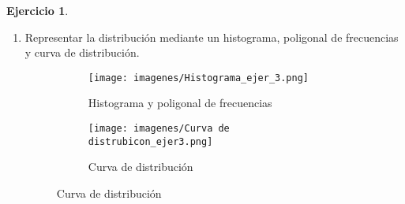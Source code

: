 \documentclass[a4paper, 12pt]{article}
\theoremstyle{definition}
\newtheorem{ej}{Ejercicio}
\begin{document}
\begin{ej}
\begin{enumerate}[label=\textit{\alph*)}]
    \begin{center}
    \begin{tabular}{|c|c|c|c|c|c|c|c|}
    \hline
     \(I_i\) & \(n_i\) & \(N_i \) & \(f_i \) & \(F_i\) & \(c_i\) & \(a_i\) & \(h_i\)  \\ \hline
     \([8300, 9300] \) & \(2 \) & \color{blue} \(2 \) & \color{blue} \(0.11 \) & \color{blue} \(0.11 \) & \color{blue} \(8800 \) & \color{blue} \(1000 \) & \color{blue} \(0.002/18 \) \\ 
     \(\color{blue} (9300 \) \(,10200] \) & \(\color{blue} 3 \) & \(5 \) & \(\color{blue} 3/18 \) & \(\color{blue} 5/18 \) & \(\color{blue} 9750 \) & \(\color{blue} 900 \) & \(\color{blue} 0.00\wideparen{3}/18 \) \\
     \(\color{blue} (10200, 11300] \) & \(\color{blue} 5 \) & \(\color{blue} 10 \) & \(\color{blue} 5/18 \) & \(10/18 \)  & \(\color{blue} 10750 \) & \(1100 \) & \(\color{blue} 0.00\wideparen{45}/18 \)   \\ 
     \(\color{blue} (11300, 12700] \) & \(\color{blue} 2 \) & \(\color{blue} 12 \) & \(2/18 \) & \(\color{blue} 12/18 \) & \(12000 \) & \(\color{blue} 1400 \) & \(\color{blue} 0.0014/18 \)  \\ 
     \(\color{blue} (12700, 13500] \) & \(4 \) & \(\color{blue} 16 \) & \(\color{blue} 4/18 \) & \(\color{blue} 16/18 \) & \(\color{blue} 13100 \) & \(\color{blue} 800 \) & \(0.005/18\) \\ 
     \(\color{blue} (13500, 14500] \) & \(\color{blue} 2 \) & \(18 \) & \(\color{blue} 2/18 \) & \(\color{blue} 18/18 \) & \(\color{blue} 14000 \) & \(\color{blue} 1000 \) & \(0.002/18\) \\ 
     \hline
    \end{tabular}
    \end{center}
    
    \newpage
    
    \item Representar la distribución mediante un histograma, poligonal de frecuencias y curva de distribución.
    
    \begin{figure}[h!]
        \centering
        \begin{subfigure}[b]{0.45\linewidth}
        \texttt{[image: imagenes/Histograma\_ejer\_3.png]}
        \caption{Histograma y poligonal de frecuencias}
        \end{subfigure}
        \begin{subfigure}[b]{0.45\linewidth}
        \texttt{[image: imagenes/Curva de distrubicon\_ejer3.png]}
        \caption{Curva de distribución}
        \end{subfigure}
    \end{figure}
    

\end{enumerate}
\end{ej}
\end{document}

